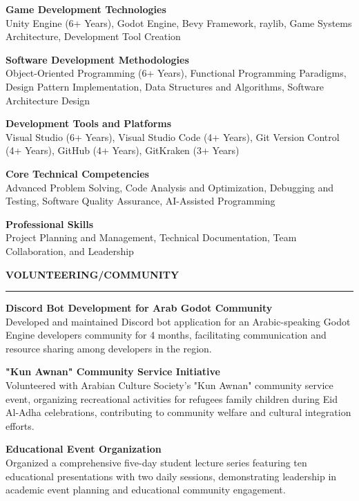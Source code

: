 \documentclass[a4paper,10pt]{article}
\newcommand{\sectionheading}[1]{%
  \addvspace{\medskipamount}%
  {\large\bfseries\MakeUppercase{#1}} %
  \noindent\rule{\linewidth}{0.4pt}%
  \vspace{\smallskipamount}%
}
\begin{document}
\textbf{Game Development Technologies}\\
Unity Engine (6+ Years), Godot Engine, Bevy Framework, raylib, Game Systems Architecture, Development Tool Creation

\addvspace{\smallskipamount}

\textbf{Software Development Methodologies}\\
Object-Oriented Programming (6+ Years), Functional Programming Paradigms, Design Pattern Implementation, Data Structures and Algorithms, Software Architecture Design

\addvspace{\smallskipamount}

\textbf{Development Tools and Platforms}\\
Visual Studio (6+ Years), Visual Studio Code (4+ Years), Git Version Control (4+ Years), GitHub (4+ Years), GitKraken (3+ Years)

\addvspace{\smallskipamount}

\textbf{Core Technical Competencies}\\
Advanced Problem Solving, Code Analysis and Optimization, Debugging and Testing, Software Quality Assurance, AI-Assisted Programming

\addvspace{\smallskipamount}

\textbf{Professional Skills}\\
Project Planning and Management, Technical Documentation, Team Collaboration, and Leadership

\sectionheading{Volunteering/Community}

\textbf{Discord Bot Development for Arab Godot Community}\\
Developed and maintained Discord bot application for an Arabic-speaking Godot Engine developers community for 4 months, facilitating communication and resource sharing among developers in the region.

\addvspace{\smallskipamount}

\textbf{"Kun Awnan" Community Service Initiative}\\
Volunteered with Arabian Culture Society's "Kun Awnan" community service event, organizing recreational activities for refugees family children during Eid Al-Adha celebrations, contributing to community welfare and cultural integration efforts.

\addvspace{\smallskipamount}

\textbf{Educational Event Organization}\\
Organized a comprehensive five-day student lecture series featuring ten educational presentations with two daily sessions, demonstrating leadership in academic event planning and educational community engagement.
\end{document}
